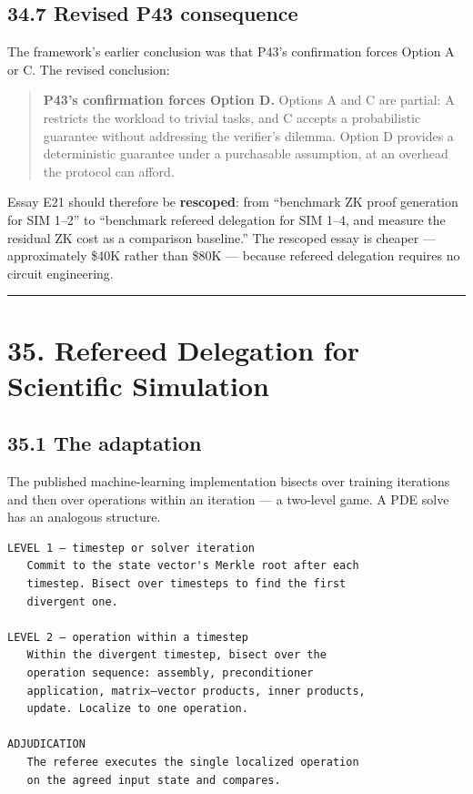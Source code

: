 \documentclass[
  11pt]{report}
\begin{document}
\hypertarget{revised-p43-consequence}{%
\section{34.7 Revised P43 consequence}\label{revised-p43-consequence}}

The framework's earlier conclusion was that P43's confirmation forces
Option A or C. The revised conclusion:

\begin{quote}
\textbf{P43's confirmation forces Option D.} Options A and C are
partial: A restricts the workload to trivial tasks, and C accepts a
probabilistic guarantee without addressing the verifier's dilemma.
Option D provides a deterministic guarantee under a purchasable
assumption, at an overhead the protocol can afford.
\end{quote}

Essay E21 should therefore be \textbf{rescoped}: from ``benchmark ZK
proof generation for SIM 1--2'' to ``benchmark refereed delegation for
SIM 1--4, and measure the residual ZK cost as a comparison baseline.''
The rescoped essay is cheaper --- approximately \$40K rather than \$80K
--- because refereed delegation requires no circuit engineering.

\begin{center}\rule{0.5\linewidth}{0.5pt}\end{center}

\hypertarget{refereed-delegation-for-scientific-simulation}{%
\chapter{35. Refereed Delegation for Scientific
Simulation}\label{refereed-delegation-for-scientific-simulation}}

\hypertarget{the-adaptation}{%
\section{35.1 The adaptation}\label{the-adaptation}}

The published machine-learning implementation bisects over training
iterations and then over operations within an iteration --- a two-level
game. A PDE solve has an analogous structure.

\begin{verbatim}
LEVEL 1 — timestep or solver iteration
   Commit to the state vector's Merkle root after each
   timestep. Bisect over timesteps to find the first
   divergent one.

LEVEL 2 — operation within a timestep
   Within the divergent timestep, bisect over the
   operation sequence: assembly, preconditioner
   application, matrix–vector products, inner products,
   update. Localize to one operation.

ADJUDICATION
   The referee executes the single localized operation
   on the agreed input state and compares.
\end{verbatim}
\end{document}
